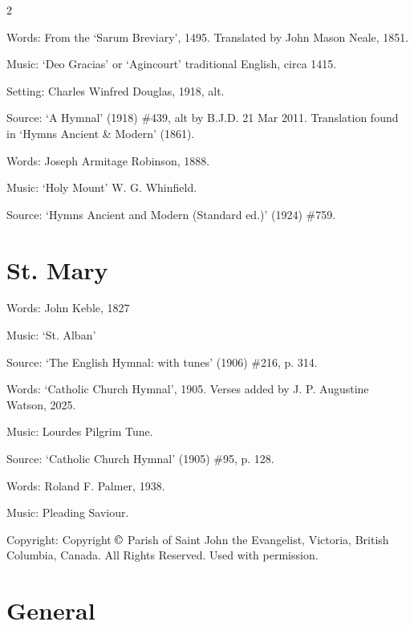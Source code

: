 \begin{multicols}{2}
\par\noindent
Words: From the `Sarum Breviary', 1495. Translated by John Mason Neale, 1851.
\par\noindent
Music: `Deo Gracias' or `Agincourt' traditional English, circa 1415.
\par\noindent
Setting: Charles Winfred Douglas, 1918, alt.
\par\noindent
Source: `A Hymnal' (1918) \#439, alt by B.J.D. 21 Mar 2011. Translation found in `Hymns Ancient \& Modern' (1861).


\par\noindent
Words: Joseph Armitage Robinson, 1888.
\par\noindent
Music: `Holy Mount' W. G. Whinfield.
\par\noindent
Source: `Hymns Ancient and Modern (Standard ed.)' (1924) \#759.


\section*{St. Mary}

\par\noindent
Words: John Keble, 1827
\par\noindent
Music: `St. Alban'
\par\noindent
Source: `The English Hymnal: with tunes' (1906) \#216, p. 314.


\par\noindent
Words: `Catholic Church Hymnal', 1905. Verses added by J. P. Augustine Watson, 2025.
\par\noindent
Music: Lourdes Pilgrim Tune.
\par\noindent
Source: `Catholic Church Hymnal' (1905) \#95, p. 128.


\par\noindent
Words: Roland F. Palmer, 1938.
\par\noindent
Music: Pleading Saviour.
\par\noindent
Copyright: Copyright $\copyright$ Parish of Saint John the Evangelist, Victoria, British Columbia, Canada. All Rights Reserved. Used with permission.


\newcolumn

\section*{General}


\end{multicols}

